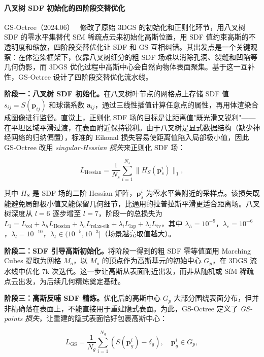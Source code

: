 \paragraph{八叉树 SDF 初始化的四阶段交替优化}

GS-Octree（2024.06）~\cite{2406_18199} 修改了原始 3DGS 的初始化和正则化环节，用八叉树 SDF 的零水平集替代 SfM 稀疏点云来初始化高斯位置，用 SDF 值约束高斯的不透明度和缩放，四阶段交替优化让 SDF 和 GS 互相纠错。其出发点是一个关键观察：在体渲染框架下，仅靠八叉树细分的粗 SDF 场难以消除孔洞、裂缝和凹陷等几何伪影，而 3DGS 优化过程中高斯中心会自然向物体表面聚集。基于这一互补性，GS-Octree 设计了四阶段交替优化流水线。

\textbf{阶段一：八叉树 SDF 初始化。}在八叉树叶节点的网格点上存储 SDF 值 $s_{ij}=S(\mathbf{p}_{ij})$ 和球谐系数 $\mathbf{a}_{ij}$，通过三线性插值计算任意点的属性，再用体渲染合成图像进行监督。直觉上，正则化 SDF 场的目标是让距离值"既光滑又锐利"——在平坦区域平滑过渡，在表面附近保持锐利。由于八叉树是显式数据结构（缺少神经网络的归纳偏置），标准的 Eikonal 损失容易使距离值陷入局部极小值，因此 GS-Octree 改用 \emph{singular-Hessian 损失}来正则化 SDF 场：

\begin{equation}
L_{\text{Hessian}} = \frac{1}{N_s}\sum_{i=1}^{N_s}\|H_S(\mathbf{p}_s^i)\|_1,
\end{equation}

其中 $H_S$ 是 SDF 场的二阶 Hessian 矩阵，$\mathbf{p}_s^i$ 为零水平集附近的采样点。该损失既能避免局部极小值又能保留几何细节，比通用的拉普拉斯平滑更适合距离场。八叉树深度从 $l{=}6$ 逐步增至 $l{=}7$，阶段一的总损失为 $L_1 = L_{\text{col}} + \lambda_h L_{\text{Hessian}} + \lambda_e L_{\text{relax-eik}} + \lambda_l L_{\text{lap}} + \lambda_t L_{\text{tv}}$，其中 $\lambda_h{=}10^{-9}$，$\lambda_e{=}10^{-6}$，$\lambda_l{=}10^{-10}$，$\lambda_t \in (10^{-5}, 10^{-3}]$（场景越亮取值越大）。

\textbf{阶段二：SDF 引导高斯初始化。}将阶段一得到的粗 SDF 零等值面用 Marching Cubes 提取为网格 $M_o$，以 $M_o$ 的顶点作为高斯基元的初始中心 $G_p$，在 3DGS 流水线中优化 7k 次迭代。这一步让高斯从表面附近出发，而非从随机或 SfM 稀疏点云出发，为后续几何精炼奠定基础。

\textbf{阶段三：高斯反哺 SDF 精炼。}优化后的高斯中心 $G_p$ 大部分围绕表面分布，但并非精确落在表面上，不能直接用于重建隐式表面。为此，GS-Octree 定义了 \emph{GS-points 损失}，让重建的隐式表面恰好包裹高斯中心：

\begin{equation}
L_{\text{GS}} = \frac{1}{N_g}\sum_{i=1}^{N_g}(S(\mathbf{p}_g^i) - \delta_g), \quad \mathbf{p}_g^i \in G_p,
\end{equation}

